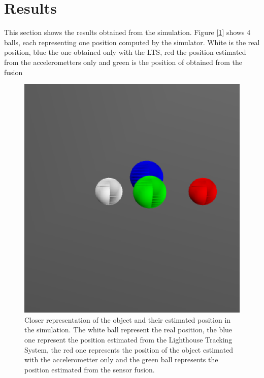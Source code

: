 \documentclass{vldb}
\begin{document}
\section{Results} \label{Res}
This section shows the results obtained from the simulation. Figure [\ref{im:visu}] shows 4 balls, each representing one position computed by the simulator. White is the real position, blue the one obtained only with the LTS, red the position estimated from the accelerometters only and green is the position of obtained from the fusion
\begin{figure}[h!]
  \includegraphics[scale = 0.7]{Image/Visulaisation.png}
  \caption{Closer representation of the object and their estimated position in the simulation. The white ball represent the real position, the blue one represent the position estimated from the Lighthouse Tracking System, the red one represents the position of the object estimated with the accelerometter only and the green ball represents the position estimated from the sensor fusion.}
  \label{im:visu}
\end{figure}
\end{document}
